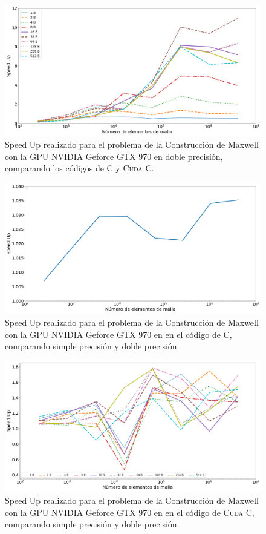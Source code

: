 \begin{figure}[htbp]
	\centering
	\includegraphics[width=\textwidth]{figs/cap4/s_970_MxC_double_10}
	\caption{Speed Up realizado para el problema de la Construcción de Maxwell con la GPU NVIDIA Geforce GTX 970 en doble precisión, comparando los códigos de \textsc{C} y \textsc{Cuda C}.} 
	\label{fig:s_970_MxC_double_10}	
\end{figure}


\begin{figure}[htbp]
	\centering
	\includegraphics[width=\textwidth]{figs/cap4/c_970_MxC_c_10}
	\caption{Speed Up realizado para el problema de la Construcción de Maxwell con la GPU NVIDIA Geforce GTX 970 en en el código de \textsc{C}, comparando simple precisión y doble precisión.} 
	\label{fig:c_970_MxC_c_10}	
\end{figure}

\begin{figure}[htbp]
	\centering
	\includegraphics[width=\textwidth]{figs/cap4/c_970_MxC_cuda_10}
	\caption{Speed Up realizado para el problema de la Construcción de Maxwell con la GPU NVIDIA Geforce GTX 970 en en el código de \textsc{Cuda C}, comparando simple precisión y doble precisión.} 
	\label{fig:c_970_MxC_cuda_10}	
\end{figure}

